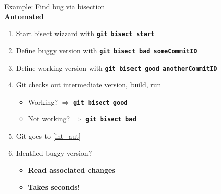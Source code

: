 \begin{frame}[fragile]
\emptyframetitle

Example: Find bug via bisection\\[7pt]

\textbf{Automated}
\begin{enumerate}
  \item Start bisect wizzard with \textbf{\texttt{git bisect start}}
  \item Define buggy version with \textbf{\texttt{git bisect bad someCommitID}}
  \item Define working version with \textbf{\texttt{git bisect good anotherCommitID}}
  \item Git checks out intermediate version, build, run\label{int_aut}
  \begin{itemize}
    \normalsize
    \item Working? $\Rightarrow$ \textbf{\texttt{git bisect good}}
    \item Not working? $\Rightarrow$ \textbf{\texttt{git bisect bad}}
  \end{itemize}
  \item Git goes to \ref{int_aut}
  \item Identfied buggy version?
  \begin{itemize}
    \normalsize
    \item \textbf{Read associated changes}
    \item \textbf{Takes seconds!}
  \end{itemize}
\end{enumerate}


\end{frame}

